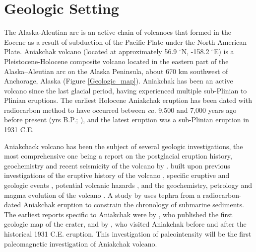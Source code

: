 \documentclass[draft]{agujournal2019}
\begin{document}
\section{Geologic Setting}

The Alaska-Aleutian arc is an active chain of volcanoes that formed in the Eocene \cite{Jicha2006a} as a result of subduction of the Pacific Plate under the North American Plate. Aniakchak volcano (located at approximately 56.9 $^{\circ}$N, -158.2 $^{\circ}$E) is a Pleistocene-Holocene composite volcano located in the eastern part of the Alaska–Aleutian arc on the Alaska Peninsula, about 670 km southwest of Anchorage, Alaska (Figure \ref{Geologic_map}). Aniakchak has been an active volcano since the last glacial period, having experienced multiple sub-Plinian to Plinian eruptions. The earliest Holocene Aniakchak eruption has been dated with radiocarbon method to have occurred between \textit{ca.} 9,500 and 7,000 years ago before present (yrs B.P.; ), and the latest eruption was a sub-Plinian eruption in 1931 C.E. 

Aniakchack volcano has been the subject of several geologic investigations, the most comprehensive one being a report on the postglacial eruption history, geochemistry and recent seismicity of the volcano by .  built upon previous investigations of the eruptive history of the volcano \cite{Miller1977a,Miller1987a,Neal1992a,Vanderhoek2004a,Vanderhoek2009a}, specific eruptive and geologic events \cite{Beget1992a,McGimsey1994a}, potential volcanic hazards \cite{Neal2001a}, and the geochemistry, petrology and magma evolution of the volcano \cite{George2004a,Dreher2005a,Symonds2003a}. A study by  uses tephra from a radiocarbon-dated Aniakchak eruption to constrain the chronology of submarine sediments. The earliest reports specific to Aniakchak were by , who published the first geologic map of the crater, and by , who visited Aniakchak before and after the historical 1931 C.E. eruption. This investigation of paleointensity will be the first paleomagnetic investigation of Aniakchak volcano.
\end{document}
